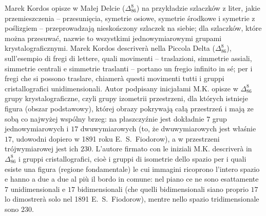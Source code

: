 Marek Kordos opisze w Małej Delcie ($\Delta_{86}^{8}$) na przykładzie szlaczków z liter, jakie przemieszczenia -- przesunięcia, symetrie osiowe, symetrie środkowe i symetrie z poślizgiem -- przeprowadzają nieskończony szlaczek na siebie; dla szlaczków, które można przesuwać, nazwie to wszystkimi jednowymiarowymi grupami krystalograficznymi. %
Marek Kordos descriverà nella Piccola Delta ($\Delta_{86}^{8}$), sull'esempio di fregi di lettere, quali movimenti -- traslazioni, simmetrie assiali, simmetrie centrali e simmetrie traslanti -- portano un fregio infinito in sé; per i fregi che si possono traslare, chiamerà questi movimenti tutti i gruppi cristallografici unidimensionali. %
Autor podpisany inicjałami M.K. opisze w $\Delta_{86}^{8}$ grupy krystalograficzne, czyli grupy izometrii przestrzeni, dla których istnieje figura (obszar podstawowy), której obrazy pokrywają całą przestrzeń i mają ze sobą co najwyżej wspólny brzeg: na płaszczyźnie jest dokładnie $7$ grup jednowymiarowych i $17$ dwuwymiarowych (to, że dwuwymiarowych jest właśnie $17$, udowodni dopiero w 1891 roku E.~S.~Fiodorow), a w przestrzeni trójwymiarowej jest ich $230$. %
L'autore firmato con le iniziali M.K. descriverà in $\Delta_{86}^{8}$ i gruppi cristallografici, cioè i gruppi di isometrie dello spazio per i quali esiste una figura (regione fondamentale) le cui immagini ricoprono l'intero spazio e hanno a due a due al più il bordo in comune: nel piano ce ne sono esattamente $7$ unidimensionali e $17$ bidimensionali (che quelli bidimensionali siano proprio $17$ lo dimostrerà solo nel 1891 E.~S.~Fiodorow), mentre nello spazio tridimensionale sono $230$. %

%